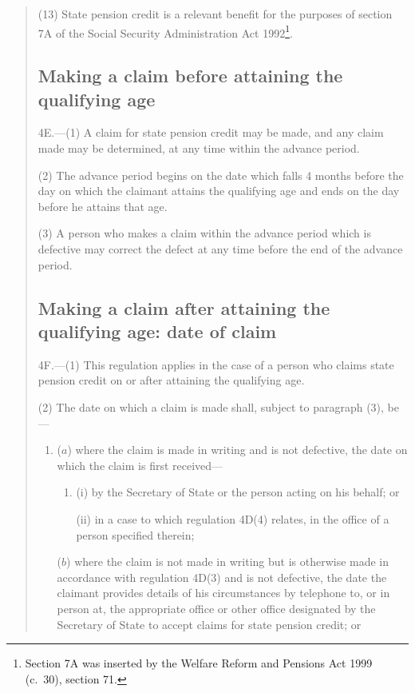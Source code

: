 \documentclass[12pt,a4paper]{article}
\begin{document}
\begin{quotation}
(13) State pension credit is a relevant benefit for the purposes of section 7A of the Social Security Administration Act 1992\footnote{Section 7A was inserted by the Welfare Reform and Pensions Act 1999 (c.\ 30), section 71.}.

\subsection*{Making a claim before attaining the qualifying age}

4E.---(1)  A claim for state pension credit may be made, and any claim made may be determined, at any time within the advance period.

(2) The advance period begins on the date which falls 4 months before the day on which the claimant attains the qualifying age and ends on the day before he attains that age.

(3) A person who makes a claim within the advance period which is defective may correct the defect at any time before the end of the advance period.

\subsection*{Making a claim after attaining the qualifying age: date of claim}

4F.---(1)  This regulation applies in the case of a person who claims state pension credit on or after attaining the qualifying age.

(2) The date on which a claim is made shall, subject to paragraph (3), be—
\begin{enumerate}\item[]
($a$) where the claim is made in writing and is not defective, the date on which the claim is first received—
\begin{enumerate}\item[]
(i) by the Secretary of State or the person acting on his behalf; or

(ii) in a case to which regulation 4D(4) relates, in the office of a person specified therein;
\end{enumerate}

($b$) where the claim is not made in writing but is otherwise made in accordance with regulation 4D(3) and is not defective, the date the claimant provides details of his circumstances by telephone to, or in person at, the appropriate office or other office designated by the Secretary of State to accept claims for state pension credit; or


\end{enumerate}
\end{quotation}
\end{document}
